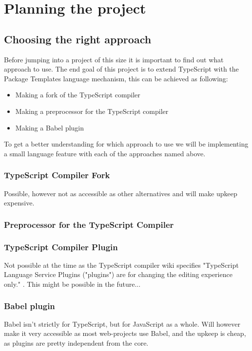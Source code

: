 
\chapter{Planning the project}\label{ch:planning-the-project}

\section{Choosing the right approach}\label{sec:choosing-the-right-approach}

Before jumping into a project of this size it is important to find out what approach to use.
The end goal of this project is to extend TypeScript with the Package Templates language mechanism,
this can be achieved as following:

\begin{itemize}
    \item Making a fork of the TypeScript compiler
    \item Making a preprocessor for the TypeScript compiler
    \item Making a Babel plugin
\end{itemize}

To get a better understanding for which approach to use we will be implementing a small language feature with each of the approaches named above.

\subsection{TypeScript Compiler Fork}

Possible, however not as accessible as other alternatives and will make upkeep expensive.

\subsection{Preprocessor for the TypeScript Compiler}

\subsection{TypeScript Compiler Plugin}

Not possible at the time as the TypeScript compiler wiki specifies "TypeScript Language Service Plugins ("plugins") are for changing the editing experience only." \cite{tscplugin}.
This might be possible in the future...

\subsection{Babel plugin}

Babel isn't strictly for TypeScript, but for JavaScript as a whole.
Will however make it very accessible as most web-projects use Babel, and the upkeep is cheap, as plugins are pretty independent from the core.
